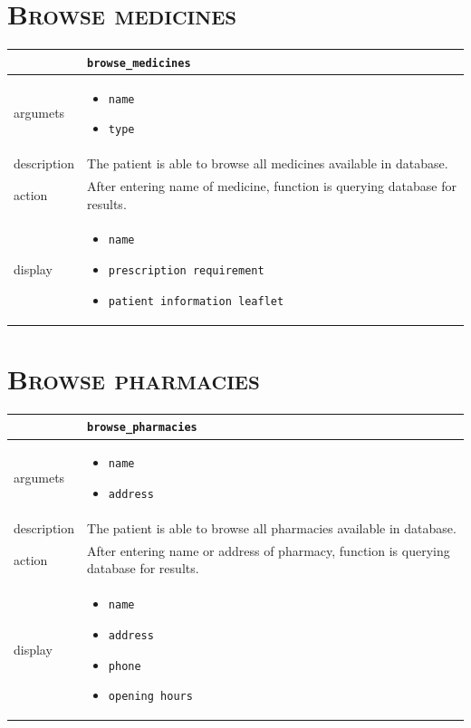 \section{\textsc{Browse medicines}}

\begin{tabularx}{\textwidth}{ |p{2.5cm}|X| }
	\hline
	 &  \texttt{browse\_medicines}\\
\hline	
argumets & 
\begin{itemize}
\item \texttt{name}
\item \texttt{type}
\end{itemize} \\
\hline
description & The patient is able to browse all medicines available in database.\\
\hline
action & After entering name of medicine, function is querying database for results.\\
\hline
display &
\begin{itemize}
\item \texttt{name}
\item \texttt{prescription requirement}
\item \texttt{patient information leaflet}
\end{itemize}\\
\hline
\end{tabularx}

\section{\textsc{Browse pharmacies}}

\begin{tabularx}{\textwidth}{ |p{2.5cm}|X| }
	\hline
	 &  \texttt{browse\_pharmacies}\\
\hline	
argumets & 
\begin{itemize}
\item \texttt{name}
\item \texttt{address}
\end{itemize} \\
\hline
description & The patient is able to browse all pharmacies available in database.\\
\hline
action & After entering name or address of pharmacy, function is querying database for results.\\
\hline
display &
\begin{itemize}
\item \texttt{name}
\item \texttt{address}
\item \texttt{phone}
\item \texttt{opening hours}
\end{itemize}\\
\hline
\end{tabularx}

